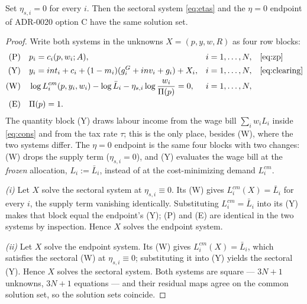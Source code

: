 \begin{proposition}[The rigid corner is the $\eta = 0$ endpoint]\label{prop:nest}
Set $\eta_{s,i} = 0$ for every $i$. Then the sectoral system \eqref{eq:etas}
and the $\eta = 0$ endpoint of ADR-0020 option C have the same solution set.
\end{proposition}

\begin{proof}
Write both systems in the unknowns $X = (p, y, w, R)$ as four row blocks:
\begin{align*}
\text{(P)} \quad & p_i = c_i(p, w_i; A), & & i = 1,\dots,N,
   & & \text{\eqref{eq:zp}} \\
\text{(Y)} \quad & y_i = int_i + c_i + (1-m_i)(g^G_i + inv_i + g_i) + X_i,
   & & i = 1,\dots,N, & & \text{\eqref{eq:clearing}} \\
\text{(W)} \quad & \log L^{cm}_i(p,y_i,w_i) - \log \bar{L}_i
   - \eta_{s,i} \log \frac{w_i}{\Pi(p)} = 0, & & i = 1,\dots,N, & & \\
\text{(E)} \quad & \Pi(p) = 1. & & & &
\end{align*}
The quantity block (Y) draws labour income from the wage bill
$\sum_i w_i L_i$ inside \eqref{eq:cons} and from the tax rate $\tau$; this is
the only place, besides (W), where the two systems differ. The $\eta = 0$
endpoint is the same four blocks with two changes: (W) drops the supply term
($\eta_{s,i} = 0$), and (Y) evaluates the wage bill at the \emph{frozen}
allocation, $L_i := \bar{L}_i$, instead of at the cost-minimizing demand
$L^{cm}_i$.

\emph{(i)} Let $X$ solve the sectoral system at $\eta_{s,i} \equiv 0$. Its (W)
gives $L^{cm}_i(X) = \bar{L}_i$ for every $i$, the supply term vanishing
identically. Substituting $L^{cm}_i = \bar{L}_i$ into its (Y) makes that block
equal the endpoint's (Y); (P) and (E) are identical in the two systems by
inspection. Hence $X$ solves the endpoint system.

\emph{(ii)} Let $X$ solve the endpoint system. Its (W) gives
$L^{cm}_i(X) = \bar{L}_i$, which satisfies the sectoral (W) at
$\eta_{s,i} \equiv 0$; substituting it into (Y) yields the sectoral (Y). Hence
$X$ solves the sectoral system. Both systems are square --- $3N+1$ unknowns,
$3N+1$ equations --- and their residual maps agree on the common solution set,
so the solution sets coincide.
\end{proof}

